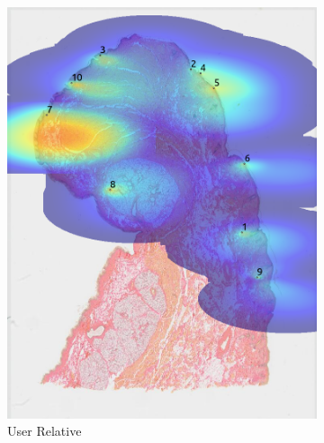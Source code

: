 \documentclass[a4paper,11pt]{report}
\numberwithin{figure}{section} %
\begin{document}
\begin{itemize}
\begin{figure}[H]
\begin{subfigure}[b]{0.19\textwidth}
            \includegraphics[width=\textwidth]{images/5501147_heatmap_user.png}
            \caption{User Relative}
            \end{subfigure}
            \begin{subfigure}[b]{0.19\textwidth}

\end{subfigure}
\end{figure}
\end{itemize}
\end{document}
